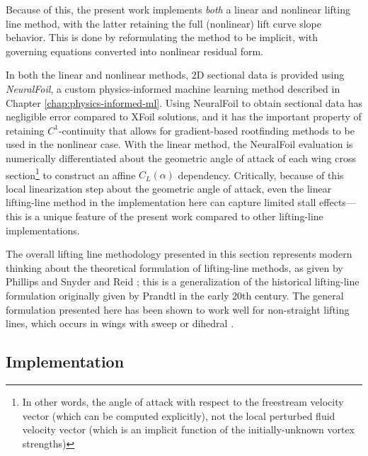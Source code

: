 Because of this, the present work implements \emph{both} a linear and nonlinear lifting line method, with the latter retaining the full (nonlinear) lift curve slope behavior. This is done by reformulating the method to be implicit, with governing equations converted into nonlinear residual form.

In both the linear and nonlinear methods, 2D sectional data is provided using \emph{NeuralFoil}, a custom physics-informed machine learning method described in Chapter \ref{chap:physics-informed-ml}. Using NeuralFoil to obtain sectional data has negligible error compared to XFoil solutions, and it has the important property of retaining $C^1$-continuity that allows for gradient-based rootfinding methods to be used in the nonlinear case. With the linear method, the NeuralFoil evaluation is numerically differentiated about the geometric angle of attack of each wing cross section\footnote{In other words, the angle of attack with respect to the freestream velocity vector (which can be computed explicitly), not the local perturbed fluid velocity vector (which is an implicit function of the initially-unknown vortex strengths)} to construct an affine $C_L(\alpha)$ dependency. Critically, because of this local linearization step about the geometric angle of attack, even the linear lifting-line method in the implementation here can capture limited stall effects—this is a unique feature of the present work compared to other lifting-line implementations.


The overall lifting line methodology presented in this section represents modern thinking about the theoretical formulation of lifting-line methods, as given by Phillips and Snyder \cite{phillips_modern_2000} and Reid \cite{reid_general_2020}; this is a generalization of the historical lifting-line formulation originally given by Prandtl in the early 20th century. The general formulation presented here has been shown to work well for non-straight lifting lines, which occurs in wings with sweep or dihedral \cite{reid_general_2020, jacobs_extension_2012, phillips_liftingline_, phillips_modern_2000}.

\subsection{Implementation}

